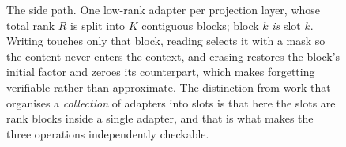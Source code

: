 \begin{figure}[t]
\caption{The side path. One low-rank adapter per projection layer, whose total rank $R$ is
split into $K$ contiguous blocks; block $k$ \emph{is} slot $k$. Writing touches only that
block, reading selects it with a mask so the content never enters the context, and erasing
restores the block's initial factor and zeroes its counterpart, which makes forgetting
verifiable rather than approximate. The distinction from work that organises a
\emph{collection} of adapters into slots is that here the slots are rank blocks inside a
single adapter, and that is what makes the three operations independently checkable.}
\label{fig:mechanism}
\end{figure}
